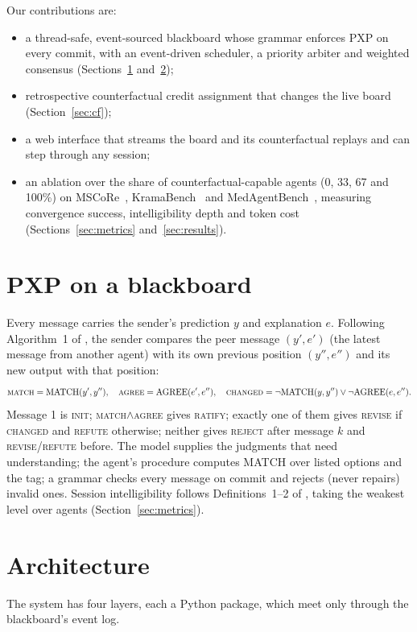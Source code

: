 \documentclass[11pt]{article}
\begin{document}
Our contributions are:
\begin{itemize}
\item a thread-safe, event-sourced blackboard whose grammar enforces PXP on every commit, with an
  event-driven scheduler, a priority arbiter and weighted consensus
  (Sections~\ref{sec:pxp} and~\ref{sec:architecture});
\item retrospective counterfactual credit assignment that changes the live board
  (Section~\ref{sec:cf});
\item a web interface that streams the board and its counterfactual replays and can step through
  any session;
\item an ablation over the share of counterfactual-capable agents (0, 33, 67 and 100\%) on
  MSCoRe~\citep{mscore}, KramaBench~\citep{kramabench} and MedAgentBench~\citep{medagentbench},
  measuring convergence success, intelligibility depth and token cost
  (Sections~\ref{sec:metrics} and~\ref{sec:results}).
\end{itemize}

\section{PXP on a blackboard}
\label{sec:pxp}
Every message carries the sender's prediction $y$ and explanation $e$. Following Algorithm~1 of
\citet{mestha2025}, the sender compares the peer message $(y', e')$ (the latest message from
another agent) with its own previous position $(y'', e'')$ and its new output with that position:
\[
\textsc{match} = \mathrm{MATCH}(y', y''),\quad \textsc{agree} = \mathrm{AGREE}(e', e''),\quad
\textsc{changed} = \neg\mathrm{MATCH}(y, y'') \lor \neg\mathrm{AGREE}(e, e'').
\]
Message 1 is \textsc{init}; \textsc{match}$\land$\textsc{agree} gives \textsc{ratify}; exactly
one of them gives \textsc{revise} if \textsc{changed} and \textsc{refute} otherwise; neither gives
\textsc{reject} after message $k$ and \textsc{revise}/\textsc{refute} before. The model supplies
the judgments that need understanding; the agent's procedure computes MATCH over listed options
and the tag; a grammar checks every message on commit and rejects (never repairs) invalid ones.
Session intelligibility follows Definitions~1--2 of \citet{mestha2025}, taking the weakest level
over agents (Section~\ref{sec:metrics}).

\section{Architecture}
\label{sec:architecture}
The system has four layers, each a Python package, which meet only through the blackboard's
event log.
\end{document}
